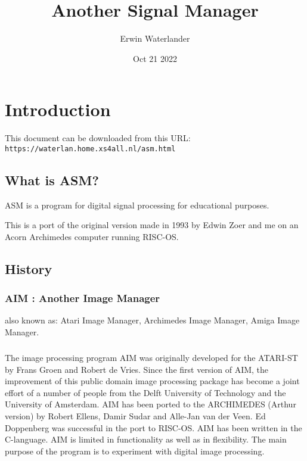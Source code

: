 \documentclass{report}
\title{Another Signal Manager}
\author{Erwin Waterlander}
\date{Oct 21 2022}          %
\begin{document}

\maketitle                   %

\tableofcontents

\chapter{Introduction}\label{chap:intro}

This document can be downloaded from this URL:\\
\texttt{https://waterlan.home.xs4all.nl/asm.html}


\section{What is ASM?}


ASM is a program for digital signal processing for educational
purposes.

This is a port of the original version made in 1993 by Edwin Zoer and me on an
Acorn Archimedes computer running RISC-OS.

\section{History}

\subsection{AIM : Another Image Manager}

also known as:
Atari Image Manager,
Archimedes Image Manager,
Amiga Image Manager. 

\paragraph{}
The image processing program AIM was originally developed for the 
ATARI-ST  by Frans Groen and  Robert de Vries.  Since  the  first 
version  of  AIM, the improvement of  this  public  domain  image 
processing  package  has  become a joint effort of  a  number  of 
people from the Delft University of Technology and the University 
of  Amsterdam.
AIM has been ported to the ARCHIMEDES (Arthur version) by  Robert
Ellens, Damir Sudar and Alle-Jan van der Veen.
Ed Doppenberg  was successful in the port to RISC-OS. 
AIM has been written in the C-language. 
AIM is limited in functionality as well as in flexibility.
The main  purpose of the program is to experiment with digital
image processing.
\end{document}

